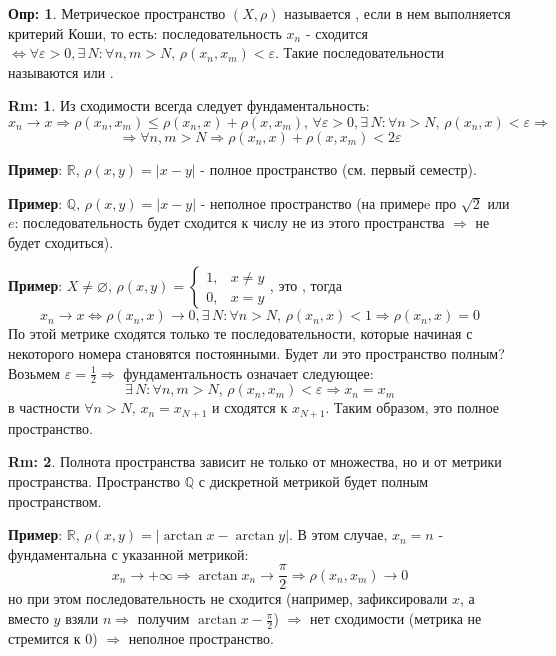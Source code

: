 \documentclass[12pt]{article}
\newcommand{\MR}{\mathbb{R}}
\newcommand{\MQ}{\mathbb{Q}}
\newcommand{\VN}{\varnothing}
\newcommand{\VE}{\varepsilon}
\theoremstyle{definition}
\newtheorem{defn}{Опр:}
\newtheorem{rem}{Rm:}
\begin{document}
\begin{defn}
	Метрическое пространство $(X,\rho)$ называется , если в нем выполняется критерий Коши, то есть: последовательность $x_n$ - сходится $\Leftrightarrow \forall \VE > 0, \exists \, N \colon \forall n, m> N, \, \rho(x_n,x_m) < \VE$. Такие последовательности называются  или .
\end{defn}
\begin{rem}
	Из сходимости всегда следует фундаментальность: 
	$$
	x_n \to x \Rightarrow \rho(x_n,x_m) \leq \rho (x_n,x) + \rho(x,x_m), \, \forall \VE > 0, \exists \, N \colon \forall n > N,\, \rho(x_n, x) < \VE \Rightarrow
	$$ 
	$$
	\Rightarrow \forall n,m > N \Rightarrow \rho (x_n,x) + \rho(x,x_m) < 2\VE
	$$
\end{rem}
\textbf{Пример}: $\MR, \, \rho(x,y) = |x-y|$ - полное пространство (см. первый семестр).

\textbf{Пример}: $\MQ, \, \rho(x,y) = |x-y|$ - неполное пространство (на примерe про $\sqrt{2}$ или $e$: последовательность будет сходится к числу не из этого пространства $\Rightarrow$ не будет сходиться).

\textbf{Пример}: $X\neq \VN,\, \rho(x,y) = \begin{cases} 1, & x \neq y \\ 0, & x = y \end{cases}$, это , тогда 
$$
x_n \to x \Leftrightarrow \rho(x_n,x) \to 0, \exists \, N \colon \forall n > N, \, \rho(x_n,x) < 1 \Rightarrow \rho(x_n,x) = 0
$$
По этой метрике сходятся только те последовательности, которые начиная с некоторого номера становятся постоянными. Будет ли это пространство полным? Возьмем $\VE = \tfrac{1}{2} \Rightarrow$ фундаментальность означает следующее:
$$
\exists \, N \colon \forall n, m > N, \, \rho(x_n,x_m) < \VE \Rightarrow x_n = x_m
$$ 
в частности $\forall n > N, \, x_n = x_{N+1}$ и сходятся к $x_{N+1}$. Таким образом, это полное пространство. 

\begin{rem}
	Полнота пространства зависит не только от множества, но и от метрики пространства. Пространство $\MQ$ с дискретной метрикой будет полным пространством.
\end{rem}

\textbf{Пример}: $\MR,\, \rho(x,y) = |\arctan{x} - \arctan{y}|$. В этом случае, $x_n = n$ - фундаментальна с указанной метрикой: 
$$x_n \to +\infty \Rightarrow \arctan{x_n} \to \dfrac{\pi}{2} \Rightarrow \rho(x_n,x_m) \to 0$$
но при этом последовательность не сходится (например, зафиксировали $x$, а вместо $y$ взяли $n \Rightarrow$ получим $\arctan{x} - \tfrac{\pi}{2}$) $\Rightarrow$ нет сходимости (метрика не стремится к $0$) $\Rightarrow$ неполное пространство.
\end{document}
